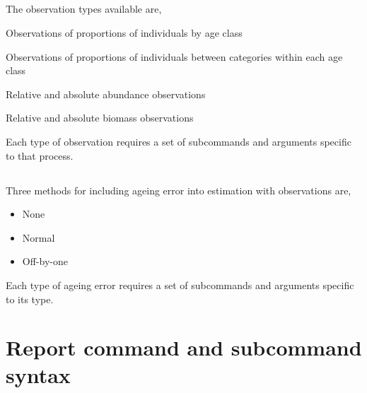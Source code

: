 
\subsection{}

The observation types available are,

\begin{description}
  \item Observations of proportions of individuals by age class
  \item Observations of proportions of individuals between categories within each age class
  \item Relative and absolute abundance observations
  \item Relative and absolute biomass observations
\end{description}

Each type of observation requires a set of subcommands and arguments specific to that process.



\subsection{}


\subsection{}

Three methods for including ageing error into estimation with observations are,

\begin{itemize}
	\item None
	\item Normal
	\item Off-by-one
\end{itemize}

Each type of ageing error requires a set of subcommands and arguments specific to its type.



\section{Report command and subcommand syntax\label{sec:report-syntax}}
\subsection{}

